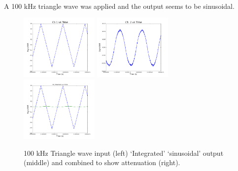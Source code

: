 \documentclass[a4paper,12pt]{article}
\begin{document}
\\
\newpage
\noindent
A 100 kHz triangle wave was applied and the output seems to be sinusoidal.
\begin{figure}[h]
\centering
\includegraphics[width=1.5in]{sam_lab2/3d_input.png}
\includegraphics[width=1.5in]{sam_lab2/3d_output.png}
\includegraphics[width=1.5in]{sam_lab2/3d_combined.png}
\caption{100 kHz Triangle wave input (left) `Integrated' `sinusoidal' output (middle) and combined to show attenuation (right). }
\end{figure}\\
\end{document}
